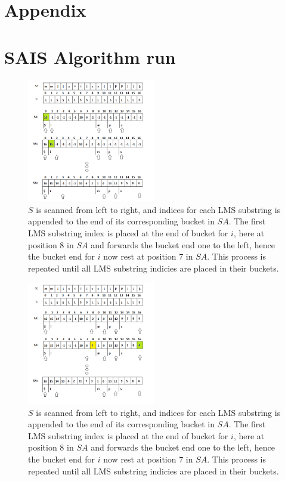 \documentclass[12pt]{article} %
\begin{document}
\section{Appendix}




\newpage
\appendix
\label{appendix}
\section{SAIS Algorithm run}\label{SAIS Algorithm run}
\begin{figure}[H]
    \centering
    \includegraphics[width=0.5\textwidth]{SAIS_LMS2}
    \captionsetup{width=0.8\textwidth}
    \caption{$S$ is scanned from left to right, and indices for each LMS substring is appended to the end of its corresponding bucket in $SA$. The first LMS substring index is placed at the end of bucket for $i$, here at position 8 in $SA$ and forwards the bucket end one to the left, hence the bucket end for $i$ now rest at position 7 in $SA$. This process is repeated until all LMS substring indicies are placed in their buckets.}
    \label{fig:SAIS_LMS2}
\end{figure}
\begin{figure}[H]
    \centering
    \includegraphics[width=0.5\textwidth]{SAIS_LMS3}
    \captionsetup{width=0.8\textwidth}
    \caption{$S$ is scanned from left to right, and indices for each LMS substring is appended to the end of its corresponding bucket in $SA$. The first LMS substring index is placed at the end of bucket for $i$, here at position 8 in $SA$ and forwards the bucket end one to the left, hence the bucket end for $i$ now rest at position 7 in $SA$. This process is repeated until all LMS substring indicies are placed in their buckets.}
    \label{fig:SAIS_LMS3}
\end{figure}
\end{document}
